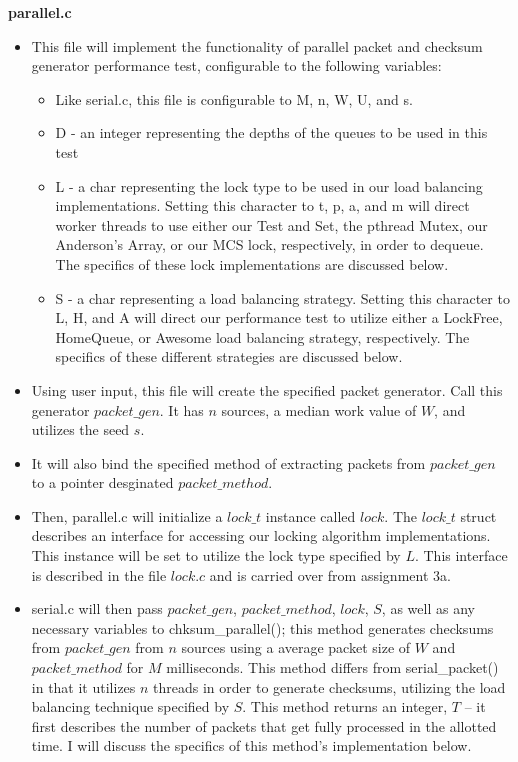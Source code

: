 \documentclass[]{article}
\begin{document}
\begin{itemize}
	\textbf{parallel.c}
	\begin{itemize}
		\item This file will implement the functionality of parallel packet and checksum generator performance test, configurable to the following variables:
		\begin{itemize}
			\item Like serial.c, this file is configurable to M, n, W, U, and s.
			\item D - an integer representing the depths of the queues to be used in this test
			\item L - a char representing the lock type to be used in our load balancing implementations. Setting this character to t, p, a, and m will direct worker threads to use either our Test and Set, the pthread Mutex, our Anderson's Array, or our MCS lock, respectively, in order to dequeue. The specifics of these lock implementations are discussed below.
			\item S - a char representing a load balancing strategy. Setting this character to L, H, and A will direct our performance test to utilize either a LockFree, HomeQueue, or Awesome load balancing strategy, respectively. The specifics of these different strategies are discussed below.
		\end{itemize}
		\item Using user input, this file will create the specified packet generator. Call this generator $packet\_gen$. It has $n$ sources, a median work value of $W$, and utilizes the seed $s$. 
		\item It will also bind the specified method of extracting packets from $packet\_gen$ to a pointer desginated $packet\_method$. 
		\item Then, parallel.c will initialize a $lock\_t$ instance called $lock$. The $lock\_t$ struct describes an interface for accessing our locking algorithm implementations. This instance will be set to utilize the lock type specified by $L$. This interface is described in the file $lock.c$ and is carried over from assignment 3a.
		\item serial.c will then pass $packet\_gen$, $packet\_method$, $lock$, $S$, as well as any necessary variables to chksum\_parallel(); this method generates checksums from $packet\_gen$ from $n$ sources using a average packet size of $W$ and $packet\_method$ for $M$ milliseconds. This method differs from serial\_packet() in that it utilizes $n$ threads in order to generate checksums, utilizing the load balancing technique specified by $S$. This method returns an integer, $T$ -- it first describes the number of packets that get fully processed in the allotted time. I will discuss the specifics of this method's implementation below. 

\end{itemize}
\end{itemize}
\end{document}
